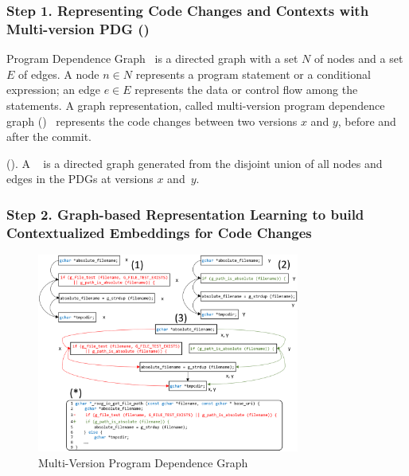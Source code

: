 \vspace{2pt}
\subsubsection*{{\bf Step 1. Representing Code Changes and Contexts with Multi-version PDG ({\mvpdgxy})}}
Program Dependence Graph~\cite{pdg} is a directed graph with a
set $N$ of nodes and a set $E$ of edges. A node $n \in N$
represents a program statement or a conditional expression; an edge $e
\in E$ represents the data or control flow among the statements.
A graph representation, called multi-version program
dependence graph ({\mvpdgxy})~\cite{flexeme-fse20} represents the
code changes between two versions $x$ and $y$, before and after the
commit. 

\begin{Definition} ({\bf {\mvpdgxy}}).
A {\mvpdgxy}~\cite{flexeme-fse20} is a directed graph generated from the
disjoint union of all nodes and edges in the PDGs at versions $x$
and~$y$.
\end{Definition}






\vspace{2pt}
\subsubsection*{{\bf Step 2. Graph-based Representation Learning to build Contextualized Embeddings for Code Changes}}

\begin{figure}
	\centering
	\includegraphics[width=3.4in]{multi-version-pdg.png}
	\caption{Multi-Version Program Dependence Graph}
	\label{fig:multi-version-pdg}
\end{figure}


